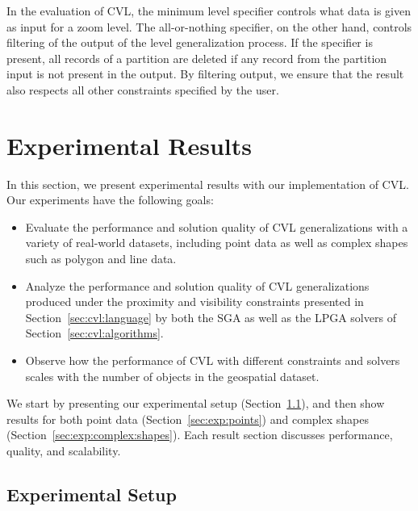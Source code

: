 \documentclass[11pt, oneside]{report}
\begin{document}
{In the evaluation of CVL, the minimum level specifier controls what data is given as input for a zoom level. The all-or-nothing specifier, on the other hand, controls filtering of the output of the level generalization process. If the specifier is present, all records of a partition are deleted if any record from the partition input is not present in the output. By filtering output, we ensure that the result also respects all other constraints specified by the user. 

\section{Experimental Results}
\label{sec:experimental}


In this section, we present experimental results with our implementation of CVL. Our experiments have the following goals:

\begin{itemize}

\item Evaluate the performance and solution quality of CVL generalizations with a variety of real-world datasets, including point data as well as complex shapes such as polygon and line data. 

\item Analyze the performance and solution quality of CVL generalizations produced under the proximity and visibility constraints presented in Section~\ref{sec:cvl:language} by both the SGA as well as the LPGA solvers of Section~\ref{sec:cvl:algorithms}.

\item Observe how the performance of CVL with different constraints and solvers scales with the number of objects in the geospatial dataset.

\end{itemize}

We start by presenting our experimental setup (Section~\ref{sec:exp:setup}), and then show results for both point data (Section~\ref{sec:exp:points}) and complex shapes (Section~\ref{sec:exp:complex:shapes}). Each result section discusses performance, quality, and scalability.


\subsection{Experimental Setup}
\label{sec:exp:setup}

}
\end{document}
